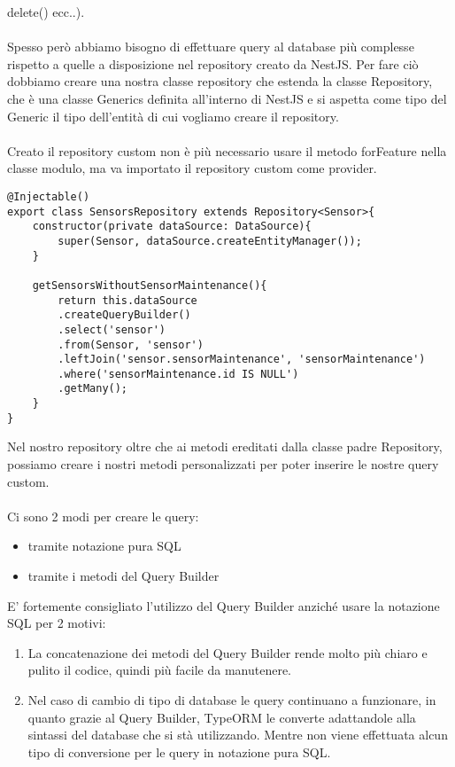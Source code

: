 delete() ecc..).
\\\\
Spesso però abbiamo bisogno di effettuare query al database più complesse rispetto a quelle a disposizione nel repository
creato da NestJS. Per fare ciò dobbiamo creare una nostra classe repository che estenda la classe Repository, che è una
classe Generics definita all'interno di NestJS e si aspetta come tipo del Generic il tipo dell'entità di cui vogliamo 
creare il repository.
\\\\
Creato il repository custom non è più necessario usare il metodo forFeature nella classe modulo, ma va importato il repository custom
come provider.
\\ 

\begin{lstlisting}
@Injectable()
export class SensorsRepository extends Repository<Sensor>{
    constructor(private dataSource: DataSource){
        super(Sensor, dataSource.createEntityManager());
    }

    getSensorsWithoutSensorMaintenance(){
        return this.dataSource
        .createQueryBuilder()
        .select('sensor')
        .from(Sensor, 'sensor')
        .leftJoin('sensor.sensorMaintenance', 'sensorMaintenance')
        .where('sensorMaintenance.id IS NULL')
        .getMany();
    }
}
\end{lstlisting}
\leavevmode\newline
Nel nostro repository oltre che ai metodi ereditati dalla classe padre Repository, possiamo creare i nostri metodi personalizzati
per poter inserire le nostre query custom. 
\\\\
Ci sono 2 modi per creare le query:
\begin{itemize}
    \item tramite notazione pura SQL 
    \item tramite i metodi del Query Builder
\end{itemize}
\leavevmode\newline
E' fortemente consigliato l'utilizzo del Query Builder anziché usare la notazione SQL per 2 motivi:
\begin{enumerate}
    \item La concatenazione dei metodi del Query Builder rende molto più chiaro e pulito il codice, quindi più facile
        da manutenere.
    \item Nel caso di cambio di tipo di database le query continuano a funzionare, in quanto grazie al Query Builder,
        TypeORM le converte adattandole alla sintassi del database che si stà utilizzando. Mentre non viene 
        effettuata alcun tipo di conversione per le query in notazione pura SQL.
\end{enumerate}
